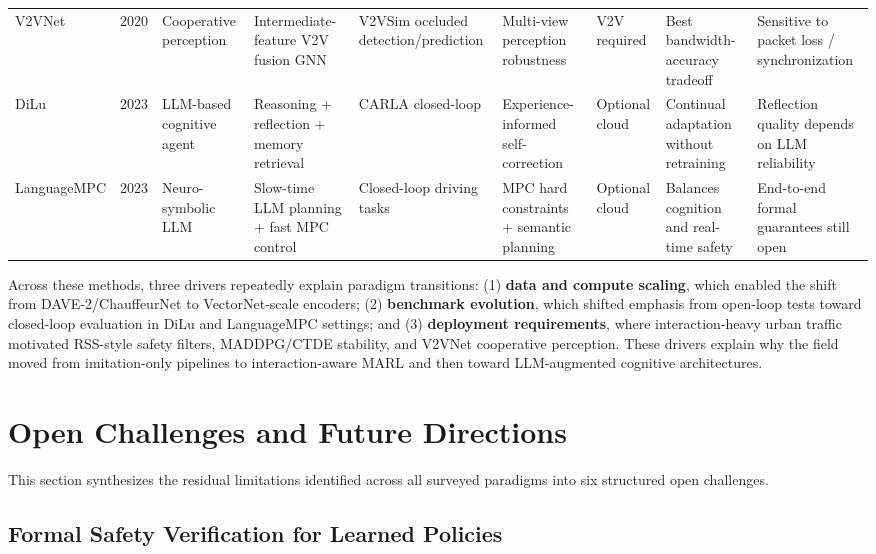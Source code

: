 \documentclass[12pt, a4paper]{article}
\begin{document}
\begin{table}[htbp]
{\begin{tabular}{p{1.7cm} p{0.8cm} p{1.4cm} p{1.8cm} p{1.8cm} p{1.5cm} p{1.6cm} p{1.8cm} p{2.0cm}}
V2VNet \citep{wang2020v2vnet} & 2020 & Cooperative perception &
Intermediate-feature V2V fusion GNN &
V2VSim occluded detection/prediction & Multi-view perception robustness & V2V required &
Best bandwidth-accuracy tradeoff & Sensitive to packet loss / synchronization \\

DiLu \citep{wen2023dilu} & 2023 & LLM-based cognitive agent &
Reasoning + reflection + memory retrieval &
CARLA closed-loop & Experience-informed self-correction & Optional cloud &
Continual adaptation without retraining & Reflection quality depends on LLM reliability \\

LanguageMPC \citep{sha2023languagempc} & 2023 & Neuro-symbolic LLM &
Slow-time LLM planning + fast MPC control &
Closed-loop driving tasks & MPC hard constraints + semantic planning & Optional cloud &
Balances cognition and real-time safety & End-to-end formal guarantees still open \\
\bottomrule
\end{tabular}%
}
\end{table}

Across these methods, three drivers repeatedly explain paradigm transitions:
(1) \textbf{data and compute scaling}, which enabled the shift from
DAVE-2/ChauffeurNet to VectorNet-scale encoders; (2) \textbf{benchmark
evolution}, which shifted emphasis from open-loop tests toward closed-loop
evaluation in DiLu and LanguageMPC settings; and (3) \textbf{deployment
requirements}, where interaction-heavy urban traffic motivated RSS-style safety
filters, MADDPG/CTDE stability, and V2VNet cooperative perception.
These drivers explain why the field moved from imitation-only pipelines to
interaction-aware MARL and then toward LLM-augmented cognitive architectures.

\section{Open Challenges and Future Directions}
\label{sec:challenges}

This section synthesizes the residual limitations identified across all surveyed
paradigms into six structured open challenges.

\subsection{Formal Safety Verification for Learned Policies}
\label{sec:safe}
\end{document}
